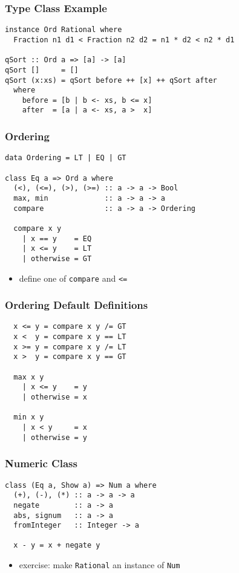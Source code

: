 \documentclass[dvipsnames]{beamer}
\theoremstyle{plain}
\begin{document}
\begin{frame}[fragile]
  \frametitle{Type Class Example}

  \begin{lstlisting}
instance Ord Rational where
  Fraction n1 d1 < Fraction n2 d2 = n1 * d2 < n2 * d1

qSort :: Ord a => [a] -> [a]
qSort []     = []
qSort (x:xs) = qSort before ++ [x] ++ qSort after
  where
    before = [b | b <- xs, b <= x]
    after  = [a | a <- xs, a >  x]
  \end{lstlisting}
\end{frame}

\begin{frame}[fragile]
  \frametitle{Ordering}

  \begin{lstlisting}
data Ordering = LT | EQ | GT

class Eq a => Ord a where
  (<), (<=), (>), (>=) :: a -> a -> Bool
  max, min             :: a -> a -> a
  compare              :: a -> a -> Ordering

  compare x y
    | x == y    = EQ
    | x <= y    = LT
    | otherwise = GT
  \end{lstlisting}

  \begin{itemize}
    \item define one of \lstinline|compare| and \lstinline|<=|
  \end{itemize}
\end{frame}

\begin{frame}[fragile]
  \frametitle{Ordering Default Definitions}

  \begin{lstlisting}
  x <= y = compare x y /= GT
  x <  y = compare x y == LT
  x >= y = compare x y /= LT
  x >  y = compare x y == GT

  max x y
    | x <= y    = y
    | otherwise = x

  min x y
    | x < y     = x
    | otherwise = y
  \end{lstlisting}
\end{frame}

\begin{frame}[fragile]
  \frametitle{Numeric Class}

  \begin{lstlisting}
class (Eq a, Show a) => Num a where
  (+), (-), (*) :: a -> a -> a
  negate        :: a -> a
  abs, signum   :: a -> a
  fromInteger   :: Integer -> a

  x - y = x + negate y
  \end{lstlisting}

  \begin{itemize}
    \item exercise: make \lstinline|Rational| an instance of
      \lstinline|Num|
  \end{itemize}
\end{frame}
\end{document}
